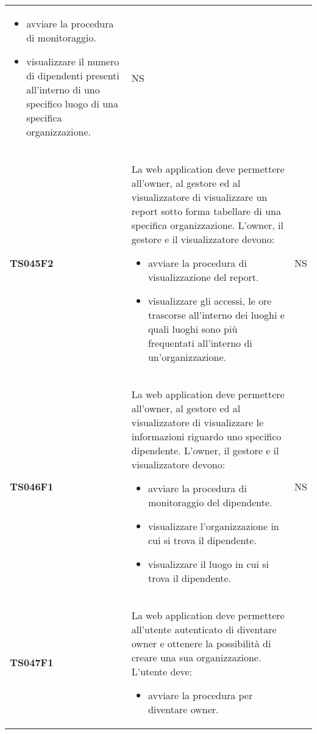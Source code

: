 \documentclass[../piano-di-qualifica.tex]{subfiles}
\begin{document}
\begin{centering}
\begin{longtable}[H]{>{\centering\bfseries}m{3cm} >{}p{10cm} >{\centering\arraybackslash}m{3cm}}
                      \begin{itemize}
                        \item avviare la procedura di monitoraggio.
                        \item visualizzare il numero di dipendenti presenti all'interno di uno specifico luogo di una specifica organizzazione.
                      \end{itemize}
                    & NS \\
        TS045F2     & La web application deve permettere all'owner, al gestore ed al visualizzatore di visualizzare un report sotto forma tabellare di una specifica organizzazione. \newline
                      L'owner, il gestore e il visualizzatore devono:
                      \begin{itemize}
                        \item avviare la procedura di visualizzazione del report.
                        \item visualizzare gli accessi, le ore trascorse all'interno dei luoghi e quali luoghi sono più frequentati all'interno di un'organizzazione.
                      \end{itemize}
                    & NS \\
        TS046F1     & La web application deve permettere all'owner, al gestore ed al visualizzatore di visualizzare le informazioni riguardo uno specifico dipendente. \newline
                      L'owner, il gestore e il visualizzatore devono:
                      \begin{itemize}
                        \item avviare la procedura di monitoraggio del dipendente.
                        \item visualizzare l'organizzazione in cui si trova il dipendente.
                        \item visualizzare il luogo in cui si trova il dipendente.
                      \end{itemize}
                    & NS \\
        TS047F1     & La web application deve permettere all'utente autenticato di diventare owner e ottenere la possibilità di creare una sua organizzazione. \newline
                      L'utente deve:
                      \begin{itemize}
                        \item avviare la procedura per diventare owner.

\end{itemize}
\end{longtable}
\end{centering}
\end{document}
